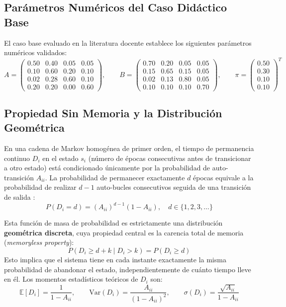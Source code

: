 \documentclass[11pt,a4paper]{article}
\begin{document}
\subsection{Parámetros Numéricos del Caso Didáctico Base}
El caso base evaluado en la literatura docente establece los siguientes parámetros numéricos validados:
\begin{equation}
A = \begin{pmatrix}
0.50 & 0.40 & 0.05 & 0.05 \\
0.10 & 0.60 & 0.20 & 0.10 \\
0.02 & 0.28 & 0.60 & 0.10 \\
0.20 & 0.20 & 0.00 & 0.60
\end{pmatrix}, \qquad
B = \begin{pmatrix}
0.70 & 0.20 & 0.05 & 0.05 \\
0.15 & 0.65 & 0.15 & 0.05 \\
0.02 & 0.13 & 0.80 & 0.05 \\
0.10 & 0.10 & 0.10 & 0.70
\end{pmatrix}, \qquad
\pi = \begin{pmatrix} 0.50 \\ 0.30 \\ 0.10 \\ 0.10 \end{pmatrix}^T
\end{equation}

\subsection{Propiedad Sin Memoria y la Distribución Geométrica}
En una cadena de Markov homogénea de primer orden, el tiempo de permanencia continuo $D_i$ en el estado $s_i$ (número de épocas consecutivas antes de transicionar a otro estado) está condicionado únicamente por la probabilidad de auto-transición $A_{ii}$. La probabilidad de permanecer exactamente $d$ épocas equivale a la probabilidad de realizar $d-1$ auto-bucles consecutivos seguida de una transición de salida \cite{rabiner1989, yu2010}:
\begin{equation}
    P(D_i = d) = (A_{ii})^{d-1}(1 - A_{ii}), \quad d \in \{1, 2, 3, \dots\}
\end{equation}

Esta función de masa de probabilidad es estrictamente una distribución \textbf{geométrica discreta}, cuya propiedad central es la carencia total de memoria (\textit{memoryless property}):
\begin{equation}
    P(D_i \ge d + k \mid D_i > k) = P(D_i \ge d)
\end{equation}
Esto implica que el sistema tiene en cada instante exactamente la misma probabilidad de abandonar el estado, independientemente de cuánto tiempo lleve en él. Los momentos estadísticos teóricos de $D_i$ son:
\begin{equation}
    \mathbb{E}[D_i] = \frac{1}{1 - A_{ii}}, \qquad \mathrm{Var}(D_i) = \frac{A_{ii}}{(1 - A_{ii})^2}, \qquad \sigma(D_i) = \frac{\sqrt{A_{ii}}}{1 - A_{ii}}
\end{equation}
\end{document}
